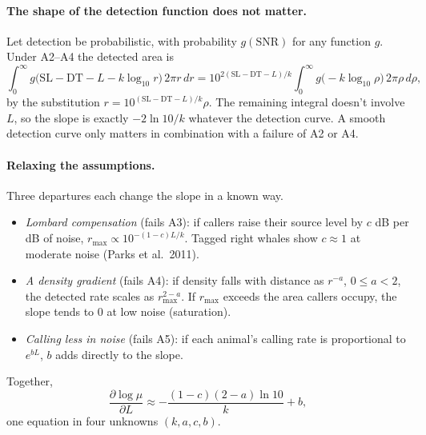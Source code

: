 \documentclass[11pt]{article}
\begin{document}
\paragraph{The shape of the detection function does not matter.}
Let detection be probabilistic, with probability $g(\mathrm{SNR})$ for any
function $g$. Under A2--A4 the detected area is
\[
\int_0^\infty g\bigl(\mathrm{SL}-\mathrm{DT}-L-k\log_{10}r\bigr)\,2\pi r\,dr
=10^{2(\mathrm{SL}-\mathrm{DT}-L)/k}\int_0^\infty g\bigl(-k\log_{10}\rho\bigr)\,2\pi\rho\,d\rho,
\]
by the substitution $r=10^{(\mathrm{SL}-\mathrm{DT}-L)/k}\rho$. The remaining
integral doesn't involve $L$, so the slope is exactly $-2\ln10/k$ whatever the
detection curve. A smooth detection curve only matters in combination with a
failure of A2 or A4.

\paragraph{Relaxing the assumptions.}
Three departures each change the slope in a known way.
\begin{itemize}
\item \emph{Lombard compensation} (fails A3): if callers raise their source
  level by $c$ dB per dB of noise, $r_{\max}\propto10^{-(1-c)L/k}$. Tagged right
  whales show $c\approx1$ at moderate noise (Parks et al.\ 2011).
\item \emph{A density gradient} (fails A4): if density falls with distance as
  $r^{-a}$, $0\le a<2$, the detected rate scales as $r_{\max}^{2-a}$. If
  $r_{\max}$ exceeds the area callers occupy, the slope tends to 0 at low
  noise (saturation).
\item \emph{Calling less in noise} (fails A5): if each animal's calling rate is
  proportional to $e^{bL}$, $b$ adds directly to the slope.
\end{itemize}
Together,
\begin{equation}\label{eq:slope4}
\frac{\partial\log\mu}{\partial L}\approx-\frac{(1-c)(2-a)\ln10}{k}+b,
\end{equation}
one equation in four unknowns $(k,a,c,b)$.
\end{document}
